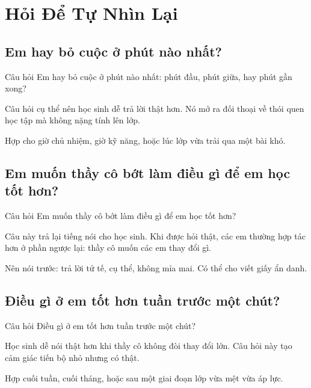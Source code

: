 \chapter{Hỏi Để Tự Nhìn Lại}

\section{Em hay bỏ cuộc ở phút nào nhất?}
\begin{cauhoibox}{Câu hỏi}
Em hay bỏ cuộc ở phút nào nhất: phút đầu, phút giữa, hay phút gần xong?
\end{cauhoibox}
\begin{taisaocoich}
Câu hỏi cụ thể nên học sinh dễ trả lời thật hơn. Nó mở ra đối thoại về thói quen học tập mà không nặng tính lên lớp.
\end{taisaocoich}
\begin{goiybien}
Hợp cho giờ chủ nhiệm, giờ kỹ năng, hoặc lúc lớp vừa trải qua một bài khó.
\end{goiybien}
\ngancach

\section{Em muốn thầy cô bớt làm điều gì để em học tốt hơn?}
\begin{cauhoibox}{Câu hỏi}
Em muốn thầy cô bớt làm điều gì để em học tốt hơn?
\end{cauhoibox}
\begin{taisaocoich}
Câu này trả lại tiếng nói cho học sinh. Khi được hỏi thật, các em thường hợp tác hơn ở phần ngược lại: thầy cô muốn các em thay đổi gì.
\end{taisaocoich}
\begin{goiybien}
Nên nói trước: trả lời tử tế, cụ thể, không mỉa mai. Có thể cho viết giấy ẩn danh.
\end{goiybien}
\ngancach

\section{Điều gì ở em tốt hơn tuần trước một chút?}
\begin{cauhoibox}{Câu hỏi}
Điều gì ở em tốt hơn tuần trước một chút?
\end{cauhoibox}
\begin{taisaocoich}
Học sinh dễ nói thật hơn khi thầy cô không đòi thay đổi lớn. Câu hỏi này tạo cảm giác tiến bộ nhỏ nhưng có thật.
\end{taisaocoich}
\begin{goiybien}
Hợp cuối tuần, cuối tháng, hoặc sau một giai đoạn lớp vừa mệt vừa áp lực.
\end{goiybien}
\ngancach

